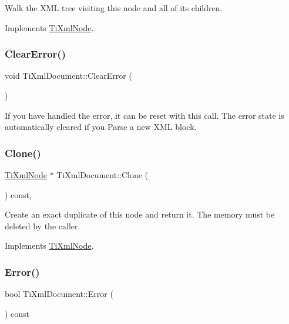 Walk the X\+ML tree visiting this node and all of its children. 

Implements \hyperlink{class_ti_xml_node_acc0f88b7462c6cb73809d410a4f5bb86}{Ti\+Xml\+Node}.

\mbox{\label{class_ti_xml_document_ac66b8c28db86363315712a3574e87c35}} 
\subsubsection{\texorpdfstring{Clear\+Error()}{ClearError()}}
{\footnotesize\ttfamily void Ti\+Xml\+Document\+::\+Clear\+Error (\begin{DoxyParamCaption}{ }\end{DoxyParamCaption})\hspace{0.3cm}{\ttfamily [inline]}}

If you have handled the error, it can be reset with this call. The error state is automatically cleared if you Parse a new X\+ML block. \mbox{\label{class_ti_xml_document_a46a4dda6c56eb106d46d4046ae1e5353}} 
\subsubsection{\texorpdfstring{Clone()}{Clone()}}
{\footnotesize\ttfamily \hyperlink{class_ti_xml_node}{Ti\+Xml\+Node} $\ast$ Ti\+Xml\+Document\+::\+Clone (\begin{DoxyParamCaption}{ }\end{DoxyParamCaption}) const\hspace{0.3cm}{\ttfamily [protected]}, {\ttfamily [virtual]}}

Create an exact duplicate of this node and return it. The memory must be deleted by the caller. 

Implements \hyperlink{class_ti_xml_node_a4508cc3a2d7a98e96a54cc09c37a78a4}{Ti\+Xml\+Node}.

\mbox{\label{class_ti_xml_document_a348e68faad4a3498f413c51ee9bc321a}} 
\subsubsection{\texorpdfstring{Error()}{Error()}}
{\footnotesize\ttfamily bool Ti\+Xml\+Document\+::\+Error (\begin{DoxyParamCaption}{ }\end{DoxyParamCaption}) const\hspace{0.3cm}{\ttfamily [inline]}}

